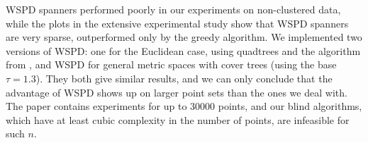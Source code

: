 


WSPD spanners performed poorly in our experiments
on non-clustered data, while the plots in the extensive experimental study \cite{farshi2009experimental}
show that WSPD spanners are very sparse, outperformed only by the greedy algorithm.
We implemented two versions of  WSPD: one for the Euclidean case,
using quadtrees and the algorithm from \cite{hp-book}, and WSPD for general metric
spaces with cover trees (using the base $\tau=1.3$). 
They both give similar results, and we can only conclude
that the advantage of WSPD shows up on larger point sets than the ones we deal with.
The paper \cite{farshi2009experimental} contains experiments for up to 30000 points,
and our blind algorithms, which have at least cubic complexity in the number of points,
are infeasible for such $n$.






